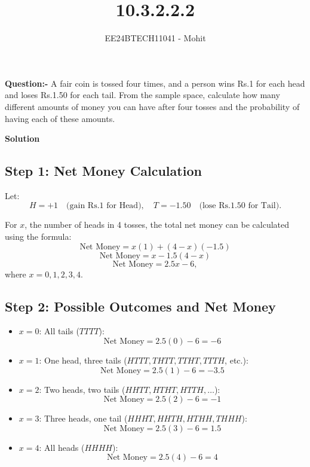 \documentclass[journal]{IEEEtran}
\numberwithin{equation}{enumi}
\numberwithin{figure}{enumi}
\begin{document}

\title{10.3.2.2.2}
\author{EE24BTECH11041 - Mohit}
{\let\newpage\relax\maketitle}
\textbf{Question:-} A fair coin is tossed four times, and a person wins Rs.1 for each head and loses Rs.1.50 for each tail. From the sample space, calculate how many different amounts of money you can have after four tosses and the probability of having each of these amounts.

\textbf{Solution}

\subsection*{Step 1: Net Money Calculation}

Let:
\[
H = +1 \quad \text{(gain Rs.1 for Head)}, \quad T = -1.50 \quad \text{(lose Rs.1.50 for Tail)}.
\]

For \( x \), the number of heads in 4 tosses, the total net money can be calculated using the formula:
\[
\text{Net Money} = x(1) + (4-x)(-1.5)
\]
\[
\text{Net Money} = x - 1.5(4-x)
\]
\[
\text{Net Money} = 2.5x - 6,
\]
where \( x = 0, 1, 2, 3, 4 \).

\subsection*{Step 2: Possible Outcomes and Net Money}

\begin{itemize}
    \item \( x = 0 \): All tails (\( TTTT \)):
    \[
    \text{Net Money} = 2.5(0) - 6 = -6
    \]
    \item \( x = 1 \): One head, three tails (\( HTTT, THTT, TTHT, TTTH \), etc.):
    \[
    \text{Net Money} = 2.5(1) - 6 = -3.5
    \]
    \item \( x = 2 \): Two heads, two tails (\( HHTT, HTHT, HTTH, \dots \)):
    \[
    \text{Net Money} = 2.5(2) - 6 = -1
    \]
    \item \( x = 3 \): Three heads, one tail (\( HHHT, HHTH, HTHH, THHH \)):
    \[
    \text{Net Money} = 2.5(3) - 6 = 1.5
    \]
    \item \( x = 4 \): All heads (\( HHHH \)):
    \[
    \text{Net Money} = 2.5(4) - 6 = 4
    \]
\end{itemize}
\end{document}
